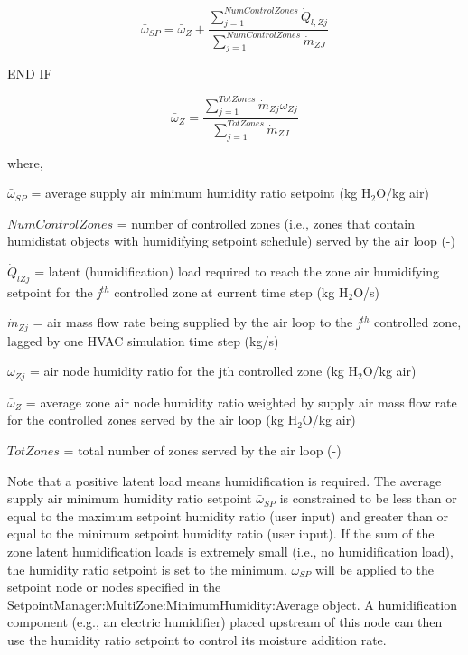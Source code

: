 \begin{equation}
  \bar{\omega}_{SP} = \bar{\omega}_Z + \frac{\sum\limits_{j = 1}^{NumControlZones}\dot{Q}_{l,Zj}}{\sum\limits_{j = 1}^{NumControlZones}\dot{m}_{ZJ}}
\end{equation}

END IF

\begin{equation}
  \bar{\omega}_{Z} = \frac{\sum\limits_{j = 1}^{TotZones}\dot{m}_{Zj}\omega_{Zj}}{\sum\limits_{j = 1}^{TotZones}\dot{m}_{ZJ}}
\end{equation}

where,

\({\bar \omega_{SP}}\) = average supply air minimum humidity ratio setpoint (kg H\(_{2}\)O/kg air)

\(NumControlZones\) = number of controlled zones (i.e., zones that contain humidistat objects with humidifying setpoint schedule) served by the air loop (-)

\({\dot Q_{lZj}}\) = latent (humidification) load required to reach the zone air humidifying setpoint for the \emph{j}\(^{th}\) controlled zone at current time step (kg H\(_{2}\)O/s)

\({\dot m_{Zj}}\) = air mass flow rate being supplied by the air loop to the \emph{j}\(^{th}\) controlled zone, lagged by one HVAC simulation time step (kg/s)

\({\omega_{Zj}}\) = air node humidity ratio for the jth controlled zone (kg H\(_{2}\)O/kg air)

\({\bar \omega_Z}\) = average zone air node humidity ratio weighted by supply air mass flow rate for the controlled zones served by the air loop (kg H\(_{2}\)O/kg air)

\(TotZones\) = total number of zones served by the air loop (-)

Note that a positive latent load means humidification is required. The average supply air minimum humidity ratio setpoint \({\bar \omega_{SP}}\) is constrained to be less than or equal to the maximum setpoint humidity ratio (user input) and greater than or equal to the minimum setpoint humidity ratio (user input). If the sum of the zone latent humidification loads is extremely small (i.e., no humidification load), the humidity ratio setpoint is set to the minimum. \({\bar \omega_{SP}}\) will be applied to the setpoint node or nodes specified in the SetpointManager:MultiZone:MinimumHumidity:Average object. A humidification component (e.g., an electric humidifier) placed upstream of this node can then use the humidity ratio setpoint to control its moisture addition rate.

